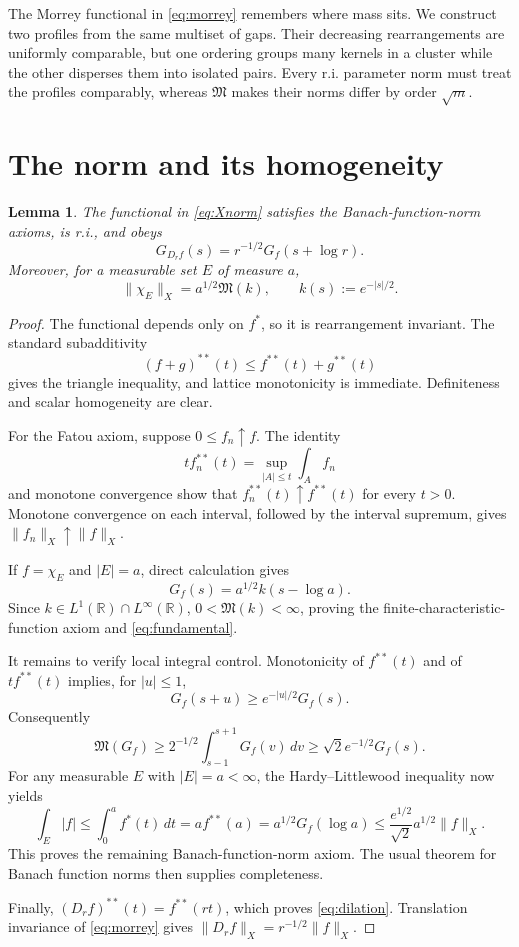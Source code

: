 \documentclass[11pt]{article}
\newtheorem{lemma}{Lemma}
\newcommand{\R}{\mathbb R}
\newcommand{\Mcal}{\mathfrak M}
\begin{document}
The Morrey functional in \eqref{eq:morrey} remembers where mass sits.  We
construct two profiles from the same multiset of gaps.  Their decreasing
rearrangements are uniformly comparable, but one ordering groups many kernels
in a cluster while the other disperses them into isolated pairs.  Every r.i.
parameter norm must treat the profiles comparably, whereas $\Mcal$ makes
their norms differ by order $\sqrt m$.

\section{The norm and its homogeneity}

\begin{lemma}\label{lem:norm}
The functional in \eqref{eq:Xnorm} satisfies the Banach-function-norm axioms,
is r.i., and obeys
\begin{equation}\label{eq:dilation}
 G_{D_r f}(s)=r^{-1/2}G_f(s+\log r).
\end{equation}
Moreover, for a measurable set $E$ of measure $a$,
\begin{equation}\label{eq:fundamental}
 \|\chi_E\|_X=a^{1/2}\Mcal(k),
 \qquad k(s):=e^{-|s|/2}.
\end{equation}
\end{lemma}

\begin{proof}
The functional depends only on $f^*$, so it is rearrangement invariant.
The standard subadditivity
\[
 (f+g)^{**}(t)\leq f^{**}(t)+g^{**}(t)
\]
gives the triangle inequality, and lattice monotonicity is immediate.
Definiteness and scalar homogeneity are clear.

For the Fatou axiom, suppose $0\leq f_n\uparrow f$.  The identity
\[
 t f_n^{**}(t)
 =\sup_{|A|\leq t}\int_A f_n
\]
and monotone convergence show that $f_n^{**}(t)\uparrow f^{**}(t)$ for every
$t>0$.  Monotone convergence on each interval, followed by the interval
supremum, gives $\|f_n\|_X\uparrow\|f\|_X$.

If $f=\chi_E$ and $|E|=a$, direct calculation gives
\[
 G_f(s)=a^{1/2}k(s-\log a).
\]
Since $k\in L^1(\R)\cap L^\infty(\R)$, $0<\Mcal(k)<\infty$, proving the
finite-characteristic-function axiom and \eqref{eq:fundamental}.

It remains to verify local integral control.  Monotonicity of $f^{**}(t)$ and
of $t f^{**}(t)$ implies, for $|u|\leq1$,
\begin{equation}\label{eq:persistence}
 G_f(s+u)\geq e^{-|u|/2}G_f(s).
\end{equation}
Consequently
\[
 \Mcal(G_f)
 \geq 2^{-1/2}\int_{s-1}^{s+1}G_f(v)\,dv
 \geq \sqrt2e^{-1/2}G_f(s).
\]
For any measurable $E$ with $|E|=a<\infty$, the Hardy--Littlewood
inequality now yields
\[
 \int_E|f|
 \leq\int_0^a f^*(t)\,dt
 =a f^{**}(a)
 =a^{1/2}G_f(\log a)
 \leq \frac{e^{1/2}}{\sqrt2}a^{1/2}\|f\|_X.
\]
This proves the remaining Banach-function-norm axiom.  The usual theorem for
Banach function norms then supplies completeness.

Finally, $(D_r f)^{**}(t)=f^{**}(rt)$, which proves
\eqref{eq:dilation}.  Translation invariance of \eqref{eq:morrey} gives
$\|D_r f\|_X=r^{-1/2}\|f\|_X$.
\end{proof}
\end{document}
